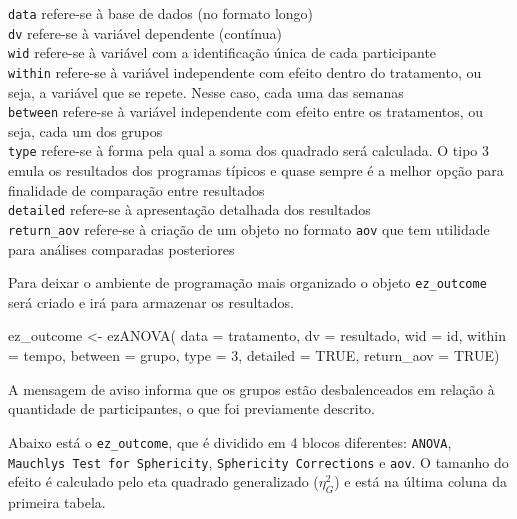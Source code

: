 \documentclass[
]{book}
\newenvironment{Shaded}{\begin{snugshade}}{\end{snugshade}}
\newcommand{\AttributeTok}[1]{\textcolor[rgb]{0.77,0.63,0.00}{#1}}
\newcommand{\ConstantTok}[1]{\textcolor[rgb]{0.00,0.00,0.00}{#1}}
\newcommand{\DecValTok}[1]{\textcolor[rgb]{0.00,0.00,0.81}{#1}}
\newcommand{\FunctionTok}[1]{\textcolor[rgb]{0.00,0.00,0.00}{#1}}
\newcommand{\NormalTok}[1]{#1}
\newcommand{\OtherTok}[1]{\textcolor[rgb]{0.56,0.35,0.01}{#1}}
\begin{document}
\texttt{data} refere-se à base de dados (no formato longo)\\
\texttt{dv} refere-se à variável dependente (contínua)\\
\texttt{wid} refere-se à variável com a identificação única de cada participante\\
\texttt{within} refere-se à variável independente com efeito dentro do tratamento, ou seja, a variável que se repete. Nesse caso, cada uma das semanas\\
\texttt{between} refere-se à variável independente com efeito entre os tratamentos, ou seja, cada um dos grupos\\
\texttt{type} refere-se à forma pela qual a soma dos quadrado será calculada. O tipo 3 emula os resultados dos programas típicos e quase sempre é a melhor opção para finalidade de comparação entre resultados\\
\texttt{detailed} refere-se à apresentação detalhada dos resultados\\
\texttt{return\_aov} refere-se à criação de um objeto no formato \texttt{aov} que tem utilidade para análises comparadas posteriores

Para deixar o ambiente de programação mais organizado o objeto \texttt{ez\_outcome} será criado e irá para armazenar os resultados.

\begin{Shaded}
\begin{Highlighting}[]
\NormalTok{ez\_outcome }\OtherTok{\textless{}{-}} \FunctionTok{ezANOVA}\NormalTok{(}
  \AttributeTok{data =}\NormalTok{ tratamento,}
  \AttributeTok{dv =}\NormalTok{ resultado,}
  \AttributeTok{wid =}\NormalTok{ id,}
  \AttributeTok{within =}\NormalTok{ tempo,}
  \AttributeTok{between =}\NormalTok{ grupo,}
  \AttributeTok{type =} \DecValTok{3}\NormalTok{,}
  \AttributeTok{detailed =} \ConstantTok{TRUE}\NormalTok{,}
  \AttributeTok{return\_aov =} \ConstantTok{TRUE}\NormalTok{)}
\end{Highlighting}
\end{Shaded}

A mensagem de aviso informa que os grupos estão desbalenceados em relação à quantidade de participantes, o que foi previamente descrito.

Abaixo está o \texttt{ez\_outcome}, que é dividido em 4 blocos diferentes: \texttt{ANOVA}, \texttt{Mauchly\textquotesingle{}s\ Test\ for\ Sphericity}, \texttt{Sphericity\ Corrections} e \texttt{aov}. O tamanho do efeito é calculado pelo eta quadrado generalizado (\(\eta^2_G\)) e está na última coluna da primeira tabela.
\end{document}

